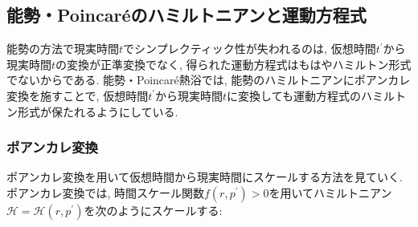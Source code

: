 \subsection{能勢・Poincar\'{e}のハミルトニアンと運動方程式}
能勢の方法で現実時間$t$でシンプレクティック性が失われるのは, 仮想時間$t^{\prime}$から現実時間$t$の変換が正準変換でなく, 得られた運動方程式はもはやハミルトン形式でないからである. 能勢・Poincar\'{e}熱浴では, 能勢のハミルトニアンにポアンカレ変換\cite{Zare1975, Okazaki2011}を施すことで, 仮想時間$t^{\prime}$から現実時間$t$に変換しても運動方程式のハミルトン形式が保たれるようにしている.

\subsubsection{ポアンカレ変換}
ポアンカレ変換\cite{Zare1975, Okazaki2011}を用いて仮想時間から現実時間にスケールする方法を見ていく.
ポアンカレ変換では, 時間スケール関数$f (r, p^{\prime}) > 0$を用いてハミルトニアン$\mathcal{H} = \mathcal{H}(r, p^{\prime})$を次のようにスケールする:

